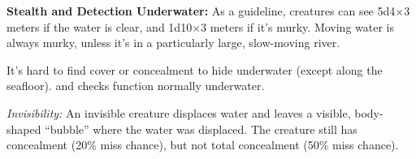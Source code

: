 


\textbf{Stealth and Detection Underwater:} As a guideline, creatures can see 5d4$\times$3 meters if the water is clear, and 1d10$\times$3 meters if it's murky. Moving water is always murky, unless it's in a particularly large, slow-moving river.

It's hard to find cover or concealment to hide underwater (except along the seafloor).  and  checks function normally underwater.

\textit{Invisibility:} An invisible creature displaces water and leaves a visible, body-shaped ``bubble'' where the water was displaced. The creature still has concealment (20\% miss chance), but not total concealment (50\% miss chance).



